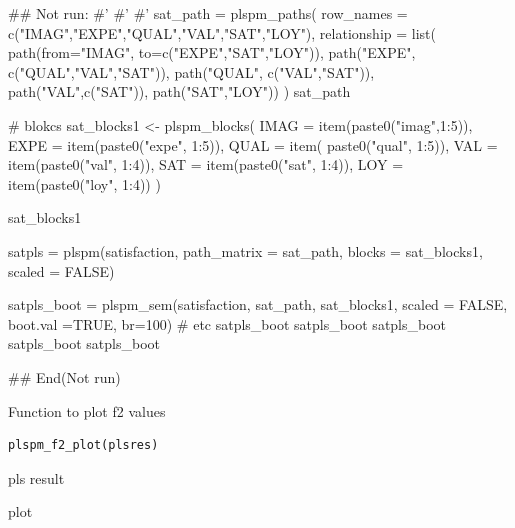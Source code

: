 \documentclass[a4paper]{book}
\begin{document}
\begin{Examples}
\begin{ExampleCode}

\#\# Not run: 
#'
#' #'
sat_path = plspm_paths(
  row_names = c("IMAG","EXPE","QUAL","VAL","SAT","LOY"),
  relationship = list(
    path(from="IMAG", to=c("EXPE","SAT","LOY")),
    path("EXPE", c("QUAL","VAL","SAT")),
    path("QUAL", c("VAL","SAT")),
    path("VAL",c("SAT")),
    path("SAT","LOY"))
)
sat_path

# blokcs
sat_blocks1 <- plspm_blocks(
  IMAG = item(paste0("imag",1:5)),
  EXPE = item(paste0("expe", 1:5)),
  QUAL = item( paste0("qual", 1:5)),
  VAL = item(paste0("val", 1:4)),
  SAT = item(paste0("sat", 1:4)),
  LOY = item(paste0("loy", 1:4))
)

sat_blocks1

satpls = plspm(satisfaction,
               path_matrix = sat_path,
               blocks = sat_blocks1,
               scaled = FALSE)

satpls_boot = plspm_sem(satisfaction, sat_path, sat_blocks1, scaled = FALSE,
                        boot.val =TRUE, br=100)
# etc
satpls_boot%
satpls_boot%
satpls_boot%
satpls_boot%
satpls_boot%

## End(Not run)



\end{ExampleCode}
\end{Examples}
%
\begin{Description}
Function to plot f2 values
\end{Description}
%
\begin{Usage}
\begin{verbatim}
plspm_f2_plot(plsres)
\end{verbatim}
\end{Usage}
%
\begin{Arguments}
\begin{ldescription}
\item[\code{plsres}] pls result
\end{ldescription}
\end{Arguments}
%
\begin{Value}
plot
\end{Value}
%
\end{document}

